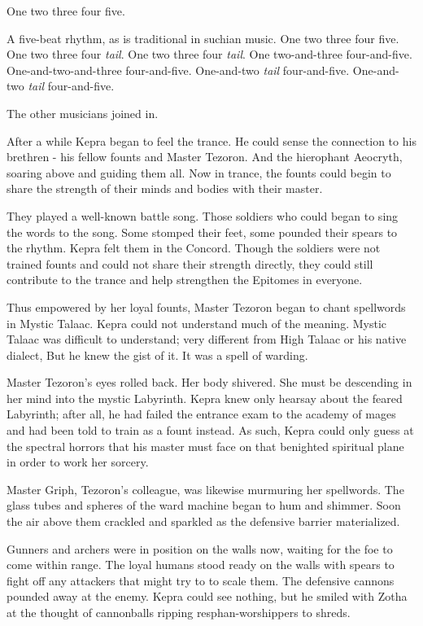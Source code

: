 \documentclass
  [a4paper,
   12pt,
   oneside
  ]%
  {article}
\begin{document}
One two three four five. 

A five-beat rhythm, as is traditional in suchian music. One two three four five. One two three four \emph{tail}. One two three four \emph{tail}. One two-and-three four-and-five. One-and-two-and-three four-and-five. One-and-two \emph{tail} four-and-five. One-and-two \emph{tail} four-and-five. 

The other musicians joined in. 

After a while Kepra began to feel the trance. He could sense the connection to his brethren - his fellow founts and Master Tezoron. And the hierophant Aeocryth, soaring above and guiding them all. 
Now in trance, the founts could begin to share the strength of their minds and bodies with their master.

They played a well-known battle song. 
Those soldiers who could began to sing the words to the song. Some stomped their feet, some pounded their spears to the rhythm. Kepra felt them in the Concord. Though the soldiers were not trained founts and could not share their strength directly, they could still contribute to the trance and help strengthen the Epitomes in everyone.

Thus empowered by her loyal founts, Master Tezoron began to chant spellwords in Mystic Talaac. 
Kepra could not understand much of the meaning. Mystic Talaac was difficult to understand; very different from High Talaac or his native dialect, 
But he knew the gist of it. It was a spell of warding. 

Master Tezoron’s eyes rolled back. Her body shivered. She must be descending in her mind into the mystic Labyrinth. Kepra knew only hearsay about the feared Labyrinth; after all, he had failed the entrance exam to the academy of mages and had been told to train as a fount instead. 
As such, Kepra could only guess at the spectral horrors that his master must face on that benighted spiritual plane in order to work her sorcery. 

Master Griph, Tezoron's colleague, was likewise murmuring her spellwords. 
The glass tubes and spheres of the ward machine began to hum and shimmer. Soon the air above them crackled and sparkled as the defensive barrier materialized.

Gunners and archers were in position on the walls now, waiting for the foe to come within range. 
The loyal humans stood ready on the walls with spears to fight off any attackers that might try to to scale them. 
The defensive cannons pounded away at the enemy. Kepra could see nothing, but he smiled with Zotha at the thought of cannonballs ripping resphan-worshippers to shreds.
\end{document}
